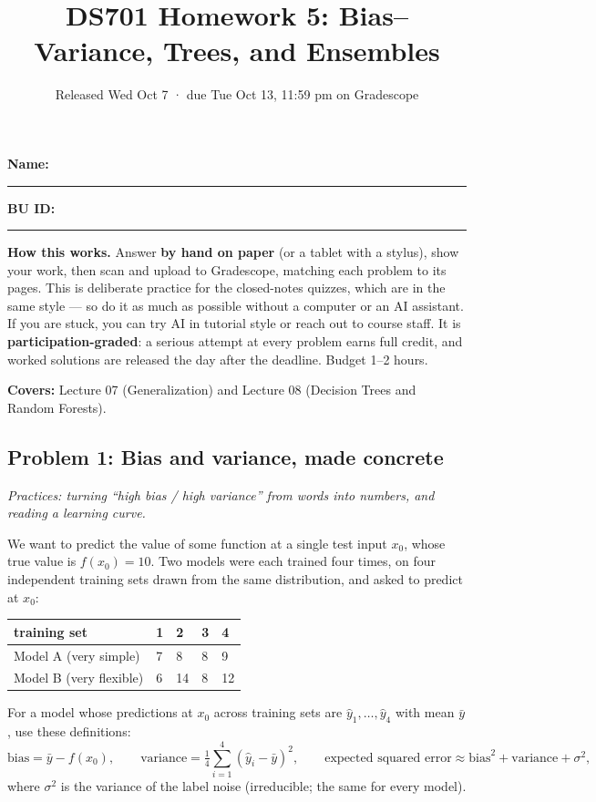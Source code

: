 \documentclass[
  11pt,
]{article}
\title{DS701 Homework 5: Bias--Variance, Trees, and Ensembles}
\subtitle{Released Wed Oct 7 · due Tue Oct 13, 11:59 pm on Gradescope}
\author{}
\date{}
\newcounter{none} %
\begin{document}
\maketitle


\noindent\textbf{Name:}\ \rule{2.0in}{0.4pt}\qquad\textbf{BU ID:}\ \rule{1.2in}{0.4pt}
\vspace{6pt}

\textbf{How this works.} Answer \textbf{by hand on paper} (or a tablet
with a stylus), show your work, then scan and upload to Gradescope,
matching each problem to its pages. This is deliberate practice for the
closed-notes quizzes, which are in the same style --- so do it as much
as possible without a computer or an AI assistant. If you are stuck, you
can try AI in tutorial style or reach out to course staff. It is
\textbf{participation-graded}: a serious attempt at every problem earns
full credit, and worked solutions are released the day after the
deadline. Budget 1--2 hours.

\textbf{Covers:} Lecture 07 (Generalization) and Lecture 08 (Decision
Trees and Random Forests).

\subsection{Problem 1: Bias and variance, made
concrete}\label{problem-1-bias-and-variance-made-concrete}

\emph{Practices: turning ``high bias / high variance'' from words into
numbers, and reading a learning curve.}

We want to predict the value of some function at a single test input
\(x_0\), whose true value is \(f(x_0) = 10\). Two models were each
trained four times, on four independent training sets drawn from the
same distribution, and asked to predict at \(x_0\):

{\def\LTcaptype{none} %
\begin{longtable}[]{@{}lllll@{}}
\toprule\noalign{}
training set & 1 & 2 & 3 & 4 \\
\midrule\noalign{}
\endhead
\bottomrule\noalign{}
\endlastfoot
Model A (very simple) & 7 & 8 & 8 & 9 \\
Model B (very flexible) & 6 & 14 & 8 & 12 \\
\end{longtable}
}

For a model whose predictions at \(x_0\) across training sets are
\(\hat y_1,\dots,\hat y_4\) with mean \(\bar y\), use these definitions:
\[\text{bias} = \bar y - f(x_0),\qquad
\text{variance} = \tfrac14\textstyle\sum_{i=1}^{4}(\hat y_i-\bar y)^2,\qquad
\text{expected squared error} \approx \text{bias}^2 + \text{variance} + \sigma^2,\]
where \(\sigma^2\) is the variance of the label noise (irreducible; the
same for every model).
\end{document}
